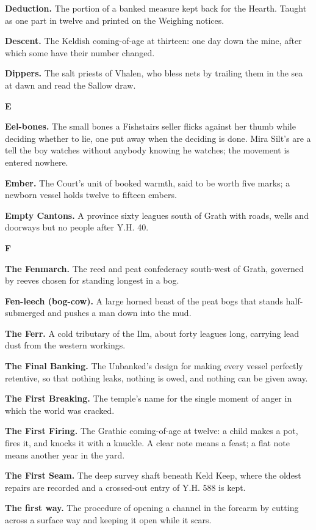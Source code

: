 \documentclass{design/chronicle}
\begin{document}
\textbf{Deduction.} The portion of a banked measure kept back for the Hearth. Taught as one part in twelve and printed on the Weighing notices.

\textbf{Descent.} The Keldish coming-of-age at thirteen: one day down the mine, after which some have their number changed.

\textbf{Dippers.} The salt priests of Vhalen, who bless nets by trailing them in the sea at dawn and read the Sallow draw.

\textbf{E}

\textbf{Eel-bones.} The small bones a Fishstairs seller flicks against her thumb while deciding whether to lie, one put away when the deciding is done. Mira Silt’s are a tell the boy watches without anybody knowing he watches; the movement is entered nowhere.

\textbf{Ember.} The Court’s unit of booked warmth, said to be worth five marks; a newborn vessel holds twelve to fifteen embers.

\textbf{Empty Cantons.} A province sixty leagues south of Grath with roads, wells and doorways but no people after Y.H. 40.

\textbf{F}

\textbf{The Fenmarch.} The reed and peat confederacy south-west of Grath, governed by reeves chosen for standing longest in a bog.

\textbf{Fen-leech (bog-cow).} A large horned beast of the peat bogs that stands half-submerged and pushes a man down into the mud.

\textbf{The Ferr.} A cold tributary of the Ilm, about forty leagues long, carrying lead dust from the western workings.

\textbf{The Final Banking.} The Unbanked’s design for making every vessel perfectly retentive, so that nothing leaks, nothing is owed, and nothing can be given away.

\textbf{The First Breaking.} The temple’s name for the single moment of anger in which the world was cracked.

\textbf{The First Firing.} The Grathic coming-of-age at twelve: a child makes a pot, fires it, and knocks it with a knuckle. A clear note means a feast; a flat note means another year in the yard.

\textbf{The First Seam.} The deep survey shaft beneath Keld Keep, where the oldest repairs are recorded and a crossed-out entry of Y.H. 588 is kept.

\textbf{The first way.} The procedure of opening a channel in the forearm by cutting across a surface way and keeping it open while it scars.
\end{document}

